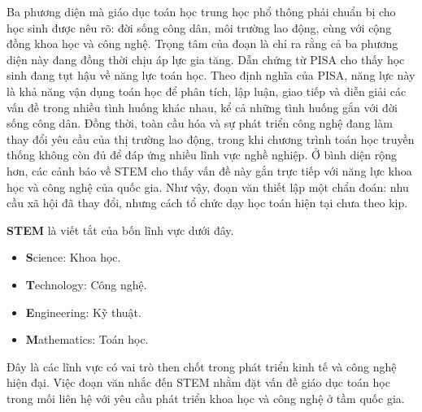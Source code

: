\documentclass[
  10pt,
  a4paper,
  landscape,
  twoside,
  openany
]{scrbook}
\newcommand{\NOTE}[1]{#1}
\begin{document}
{
\NOTE{Ba phương diện mà giáo dục toán học trung học phổ thông phải chuẩn bị cho học sinh được nêu rõ: đời sống công dân, môi trường lao động, cùng với cộng đồng khoa học và công nghệ. Trọng tâm của đoạn là chỉ ra rằng cả ba phương diện này đang đồng thời chịu áp lực gia tăng. Dẫn chứng từ PISA cho thấy học sinh đang tụt hậu về năng lực toán học. Theo định nghĩa của PISA, năng lực này là khả năng vận dụng toán học để phân tích, lập luận, giao tiếp và diễn giải các vấn đề trong nhiều tình huống khác nhau, kể cả những tình huống gắn với đời sống công dân. Đồng thời, toàn cầu hóa và sự phát triển công nghệ đang làm thay đổi yêu cầu của thị trường lao động, trong khi chương trình toán học truyền thống không còn đủ để đáp ứng nhiều lĩnh vực nghề nghiệp. Ở bình diện rộng hơn, các cảnh báo về STEM cho thấy vấn đề này gắn trực tiếp với năng lực khoa học và công nghệ của quốc gia. Như vậy, đoạn văn thiết lập một chẩn đoán: nhu cầu xã hội đã thay đổi, nhưng cách tổ chức dạy học toán hiện tại chưa theo kịp.

\noindent
\textbf{STEM} là viết tắt của bốn lĩnh vực dưới đây.
\begin{itemize}
  \item \textbf{S}cience: Khoa học.
  \item \textbf{T}echnology: Công nghệ.
  \item \textbf{E}ngineering: Kỹ thuật.
  \item \textbf{M}athematics: Toán học.
\end{itemize}
Đây là các lĩnh vực có vai trò then chốt trong phát triển kinh tế và công nghệ hiện đại. Việc đoạn văn nhắc đến STEM nhằm đặt vấn đề giáo dục toán học trong mối liên hệ với yêu cầu phát triển khoa học và công nghệ ở tầm quốc gia.}
}
\end{document}
